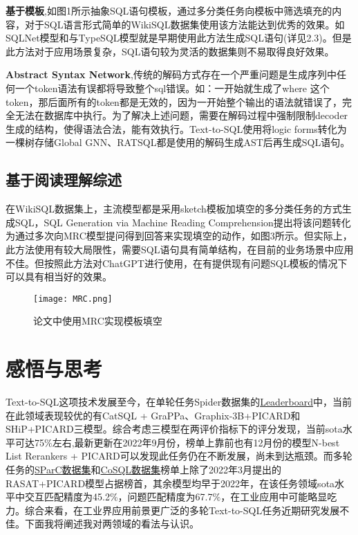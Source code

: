 \documentclass[lang=cn,a4paper,newtx]{elegantpaper}
\begin{document}
        \textbf{基于模板},如图1所示抽象SQL语句模板，通过多分类任务向模板中筛选填充的内容，对于SQL语言形式简单的WikiSQL数据集使用该方法能达到优秀的效果。如SQLNet模型\cite{7}和与TypeSQL模型\cite{8}就是早期使用此方法生成SQL语句(详见2.3)。但是此方法对于应用场景复杂，SQL语句较为灵活的数据集则不易取得良好效果。

        \textbf{Abstract Syntax Network},传统的解码方式存在一个严重问题是生成序列中任何一个token语法有误都将导致整个sql错误。如：一开始就生成了where 这个token，那后面所有的token都是无效的，因为一开始整个输出的语法就错误了，完全无法在数据库中执行。为了解决上述问题，需要在解码过程中强制限制decoder生成的结构，使得语法合法，能有效执行。Text-to-SQL使用将logic forms转化为一棵树存储Global GNN\cite{16}、RATSQL\cite{11}都是使用的解码生成AST后再生成SQL语句。
        
    \subsection{基于阅读理解综述}
    在WikiSQL数据集上，主流模型都是采用sketch模板加填空的多分类任务的方式生成SQL，SQL Generation via Machine Reading Comprehension\cite{20}提出将该问题转化为通过多次向MRC模型提问得到回答来实现填空的动作，如图3所示。但实际上，此方法使用有较大局限性，需要SQL语句具有简单结构，在目前的业务场景中应用不佳。但按照此方法对ChatGPT进行使用，在有提供现有问题SQL模板的情况下可以具有相当好的效果。

    \begin{figure}[h]
        \centering
        \texttt{[image: MRC.png]}
        \caption{论文中使用MRC实现模板填空}
    \end{figure}
    
\section{感悟与思考}
    Text-to-SQL这项技术发展至今，在单轮任务Spider数据集的\href{https://yale-lily.github.io/spider}{Leaderboard}中，当前在此领域表现较优的有CatSQL + GraPPa、Graphix-3B+PICARD和SHiP+PICARD三模型。综合考虑三模型在两评价指标下的评分发现，当前sota水平可达75$\%$左右,最新更新在2022年9月份，榜单上靠前也有12月份的模型N-best List Rerankers + PICARD可以发现此任务仍在不断发展，尚未到达瓶颈。而多轮任务的\href{https://paperswithcode.com/sota/text-to-sql-on-sparc}{SParC数据集}和\href{https://paperswithcode.com/sota/dialogue-state-tracking-on-cosql}{CoSQL数据集}榜单上除了2022年3月提出的RASAT+PICARD模型占据榜首，其余模型均早于2022年，在该任务领域sota水平中交互匹配精度为45.2$\%$，问题匹配精度为67.7$\%$，在工业应用中可能略显吃力。综合来看，在工业界应用前景更广泛的多轮Text-to-SQL任务近期研究发展不佳。下面我将阐述我对两领域的看法与认识。
\end{document}
